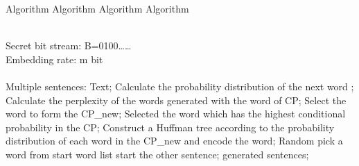 ﻿\documentclass[]{book}
\begin{document}
\begin{algorithm}[]
\caption{ Algorithm Algorithm Algorithm Algorithm}
\label{alg:Framwork}
\begin{algorithmic}[] %
\REQUIRE ~~\\ %
Secret bit stream: B={0100……}\\
Embedding rate: m bit\\

\ENSURE ~~\\ %
Multiple sentences: Text;
\STATE Calculate the probability distribution of the next word ;
\STATE \STATE Calculate the perplexity of the words generated with the word of CP;
\STATE Select the word to form the CP\_new;
\STATE Selected the word which has the highest conditional probability in the CP;
\ELSE
\STATE Construct a Huffman tree according to the probability distribution of each word in the CP\_new and encode the word;
\ENDIF
\ENDIF
\ELSE
\STATE Random pick a word from start word list start the other sentence;
\ENDIF
\RETURN generated sentences; %
\end{algorithmic}
\end{algorithm}
\end{document}

